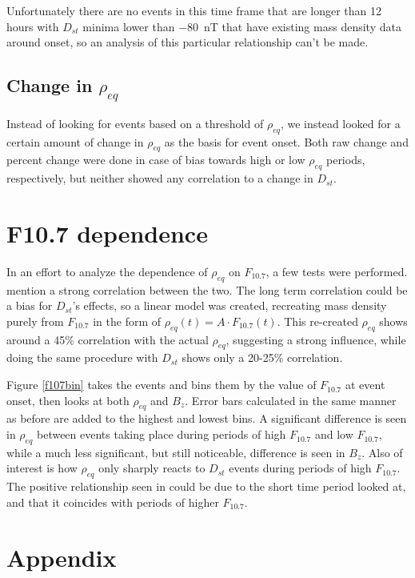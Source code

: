\documentclass[10pt,twocolumn]{article}
\begin{document}
Unfortunately there are no events in this time frame that are longer than 12 hours with $D_{st}$ minima lower than $-80$~nT that have existing mass density data around onset, so an analysis of this particular relationship can't be made.

\subsection{Change in $\rho_{eq}$}
Instead of looking for events based on a threshold of $\rho_{eq}$, we instead looked for a certain amount of change in $\rho_{eq}$ as the basis for event onset. Both raw change and percent change were done in case of bias towards high or low $\rho_{eq}$ periods, respectively, but neither showed any correlation to a change in $D_{st}$. 

\section{F10.7 dependence}
In an effort to analyze the dependence of $\rho_{eq}$ on $F_{10.7}$, a few tests were performed. \cite{Takahashi2010} mention a strong correlation between the two. The long term correlation could be a bias for $D_{st}$'s effects, so a linear model was created, recreating mass density purely from $F_{10.7}$ in the form of $\rho_{eq}(t)=A\cdot F_{10.7}(t)$. This re-created $\rho_{eq}$ shows around a 45\% correlation with the actual $\rho_{eq}$, suggesting a strong influence, while doing the same procedure with $D_{st}$ shows only a 20-25\% correlation. 

Figure \ref{f107bin} takes the events and bins them by the value of $F_{10.7}$ at event onset, then looks at both $\rho_{eq}$ and $B_z$. Error bars calculated in the same manner as before are added to the highest and lowest bins. A significant difference is seen in $\rho_{eq}$ between events taking place during periods of high $F_{10.7}$ and low $F_{10.7}$, while a much less significant, but still noticeable, difference is seen in $B_z$. Also of interest is how $\rho_{eq}$ only sharply reacts to $D_{st}$ events during periods of high $F_{10.7}$. The positive relationship seen in \cite{Takahashi2010} could be due to the short time period looked at, and that it coincides with periods of higher $F_{10.7}$.

\section{Appendix}
\end{document}
